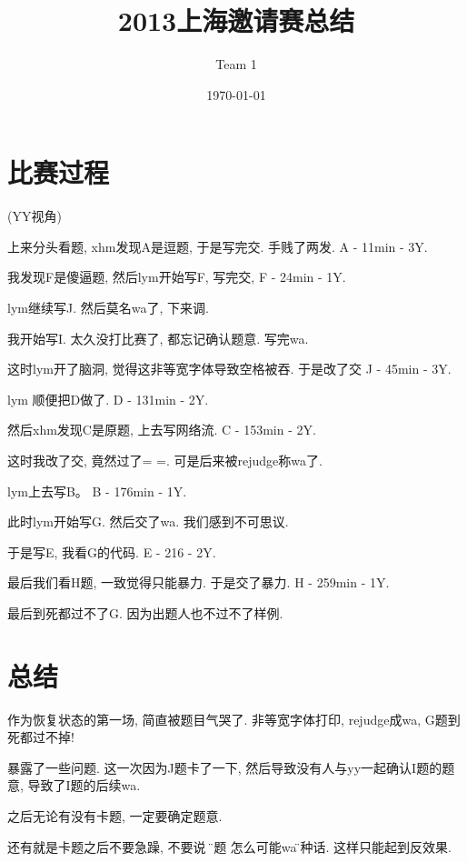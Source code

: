 \documentclass[a4paper, 11pt, nofonts, nocap, fancyhdr]{ctexart}
\title{2013上海邀请赛总结}
\author{Team 1}
\date{\today}
\begin{document}
\maketitle


\section{比赛过程}

(YY视角)

上来分头看题, xhm发现A是逗题, 于是写完交. 手贱了两发. A - 11min - 3Y.

我发现F是傻逼题, 然后lym开始写F, 写完交, F - 24min - 1Y. 

lym继续写J. 然后莫名wa了, 下来调.

我开始写I. 太久没打比赛了, 都忘记确认题意. 写完wa.

这时lym开了脑洞, 觉得这非等宽字体导致空格被吞. 于是改了交 J - 45min - 3Y.

lym 顺便把D做了. D - 131min - 2Y.

然后xhm发现C是原题, 上去写网络流. C - 153min - 2Y.

这时我改了交, 竟然过了= =. 可是后来被rejudge称wa了.

lym上去写B。 B - 176min - 1Y.

此时lym开始写G. 然后交了wa. 我们感到不可思议.

于是写E, 我看G的代码. E - 216 - 2Y.

最后我们看H题, 一致觉得只能暴力. 于是交了暴力. H - 259min - 1Y.

最后到死都过不了G. 因为出题人也不过不了样例.



\section{总结}

作为恢复状态的第一场, 简直被题目气哭了. 非等宽字体打印, rejudge成wa, G题到死都过不掉! 

暴露了一些问题. 这一次因为J题卡了一下, 然后导致没有人与yy一起确认I题的题意, 导致了I题的后续wa. 

之后无论有没有卡题, 一定要确定题意. 

还有就是卡题之后不要急躁, 不要说 \" 这题  怎么可能wa\" 这种话. 这样只能起到反效果.
\end{document}
